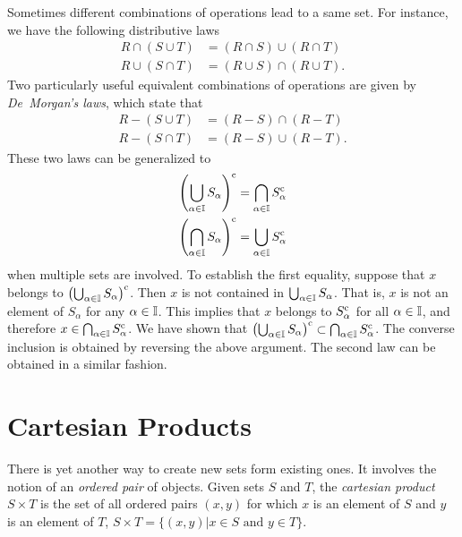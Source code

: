 Sometimes different combinations of operations lead to a same set.
For instance, we have the following distributive laws
\begin{align*}
R \cap (S \cup T) &= (R \cap S) \cup (R \cap T) \\
R \cup (S \cap T) &= (R \cup S) \cap (R \cup T).
\end{align*}
Two particularly useful equivalent combinations of operations are given by \emph{De~Morgan's laws}, which state that
\begin{align*}
R - (S \cup T) &= (R - S) \cap (R - T) \\
R - (S \cap T) &= (R - S) \cup (R - T).
\end{align*}
These two laws can be generalized to
\begin{align*}
\left( \bigcup_{\alpha \in \mathbb{I}} S_{\alpha} \right)^{\mathrm{c}}
&= \bigcap_{\alpha \in \mathbb{I}} S_{\alpha}^{\mathrm{c}} \\
\left( \bigcap_{\alpha \in \mathbb{I}} S_{\alpha} \right)^{\mathrm{c}}
&= \bigcup_{\alpha \in \mathbb{I}} S_{\alpha}^{\mathrm{c}}
\end{align*}
when multiple sets are involved.
To establish the first equality, suppose that $x$ belongs to $\left( \bigcup_{\alpha \in \mathbb{I}} S_{\alpha} \right)^{\mathrm{c}}$.
Then $x$ is not contained in $\bigcup_{\alpha \in \mathbb{I}} S_{\alpha}$.
That is, $x$ is not an element of $S_{\alpha}$ for any $\alpha \in \mathbb{I}$.
This implies that $x$ belongs to $S_{\alpha}^{\mathrm{c}}$ for all $\alpha \in \mathbb{I}$, and therefore $x \in \bigcap_{\alpha \in \mathbb{I}} S_{\alpha}^{\mathrm{c}}$.
We have shown that $\left( \bigcup_{\alpha \in \mathbb{I}} S_{\alpha} \right)^{\mathrm{c}} \subset \bigcap_{\alpha \in \mathbb{I}} S_{\alpha}^{\mathrm{c}}$.
The converse inclusion is obtained by reversing the above argument.
The second law can be obtained in a similar fashion.


\section{Cartesian Products}

There is yet another way to create new sets form existing ones.
It involves the notion of an \emph{ordered pair} of objects.
Given sets $S$ and $T$, the \emph{cartesian product} $S \times T$ is the set of all ordered pairs $(x, y)$ for which $x$ is an element of $S$ and $y$ is an element of $T$, $S \times T = \{ (x, y) | x \in S \text{ and } y \in T \}$.


